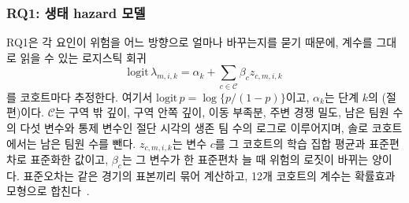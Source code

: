 \subsubsection{RQ1: 생태 hazard 모델}
\label{sec:method:rq1}
RQ1은 각 요인이 위험을 어느 방향으로 얼마나 바꾸는지를 묻기 때문에, 계수를 그대로 읽을 수 있는 로지스틱 회귀
\begin{equation}
\mathrm{logit}\,\lambda_{m,i,k}=\alpha_k+\textstyle\sum_{c\in\mathcal{C}}\beta_c z_{c,m,i,k}
\label{eq:ehm}
\end{equation}
를 코호트마다 추정한다.
여기서 $\mathrm{logit}\,p=\log\{p/(1-p)\}$이고, $\alpha_k$는 단계 $k$의 (절편)이다.
$\mathcal{C}$는 구역 밖 깊이, 구역 안쪽 깊이, 이동 부족분, 주변 경쟁 밀도, 남은 팀원 수의 다섯 변수와 통제 변수인 절단 시각의 생존 팀 수의 로그로 이루어지며, 솔로 코호트에서는 남은 팀원 수를 뺀다.
$z_{c,m,i,k}$는 변수 $c$를 그 코호트의 학습 집합 평균과 표준편차로 표준화한 값이고, $\beta_c$는 그 변수가 한 표준편차 늘 때 위험의 로짓이 바뀌는 양이다.
표준오차는 같은 경기의 표본끼리 묶어 계산하고, 12개 코호트의 계수는 확률효과 모형으로 합친다~\cite{DerSimonian86}.
 


